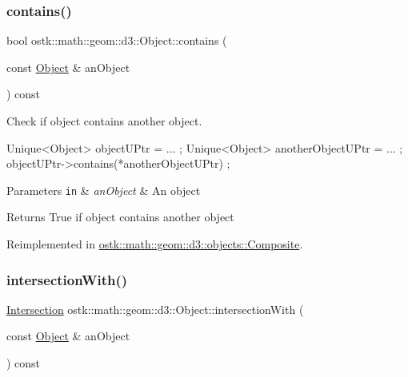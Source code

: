 \subsubsection{\texorpdfstring{contains()}{contains()}}
{\footnotesize\ttfamily bool ostk\+::math\+::geom\+::d3\+::\+Object\+::contains (\begin{DoxyParamCaption}\item[{const \hyperlink{classostk_1_1math_1_1geom_1_1d3_1_1_object}{Object} \&}]{an\+Object }\end{DoxyParamCaption}) const\hspace{0.3cm}{\ttfamily [virtual]}}



Check if object contains another object. 


\begin{DoxyCode}
Unique<Object> objectUPtr = ... ;
Unique<Object> anotherObjectUPtr = ... ;
objectUPtr->contains(*anotherObjectUPtr) ;
\end{DoxyCode}



\begin{DoxyParams}[1]{Parameters}
\mbox{\tt in}  & {\em an\+Object} & An object \\
\hline
\end{DoxyParams}
\begin{DoxyReturn}{Returns}
True if object contains another object 
\end{DoxyReturn}


Reimplemented in \hyperlink{classostk_1_1math_1_1geom_1_1d3_1_1objects_1_1_composite_abe810bb7e17c444b1b556053e32750d1}{ostk\+::math\+::geom\+::d3\+::objects\+::\+Composite}.

\mbox{\label{classostk_1_1math_1_1geom_1_1d3_1_1_object_a04622921234740473c7731fa6c5bad0a}} 
\subsubsection{\texorpdfstring{intersection\+With()}{intersectionWith()}}
{\footnotesize\ttfamily \hyperlink{classostk_1_1math_1_1geom_1_1d3_1_1_intersection}{Intersection} ostk\+::math\+::geom\+::d3\+::\+Object\+::intersection\+With (\begin{DoxyParamCaption}\item[{const \hyperlink{classostk_1_1math_1_1geom_1_1d3_1_1_object}{Object} \&}]{an\+Object }\end{DoxyParamCaption}) const\hspace{0.3cm}{\ttfamily [virtual]}}



